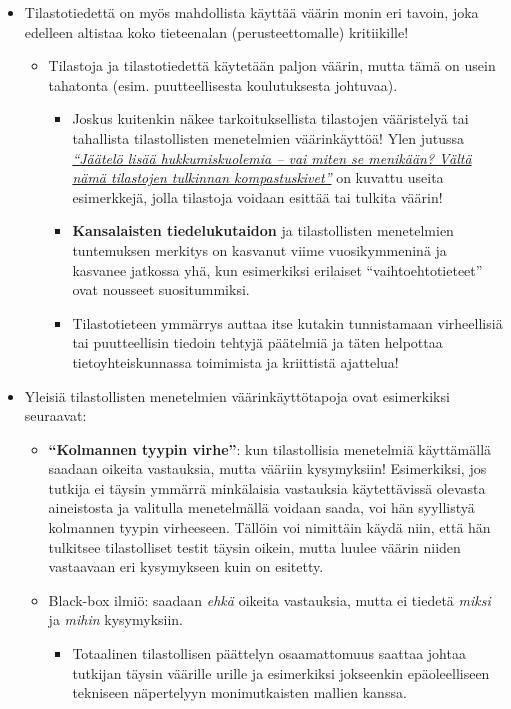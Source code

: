 \documentclass[
]{book}
\providecommand{\tightlist}{%
  \setlength{\itemsep}{0pt}\setlength{\parskip}{0pt}}
\begin{document}
\begin{itemize}
\tightlist
\item
  Tilastotiedettä on myös mahdollista käyttää väärin monin eri tavoin, joka edelleen altistaa koko tieteenalan (perusteettomalle) kritiikille!

  \begin{itemize}
  \tightlist
  \item
    Tilastoja ja tilastotiedettä käytetään paljon väärin, mutta tämä on usein tahatonta (esim. puutteellisesta koulutuksesta johtuvaa).

    \begin{itemize}
    \tightlist
    \item
      Joskus kuitenkin näkee tarkoituksellista tilastojen vääristelyä tai tahallista tilastollisten menetelmien väärinkäyttöä! Ylen jutussa \href{https://yle.fi/aihe/artikkeli/2021/03/27/jaatelo-lisaa-hukkumiskuolemia-vai-miten-se-menikaan-valta-nama-tilastojen}{\emph{``Jäätelö lisää hukkumiskuolemia -- vai miten se menikään? Vältä nämä tilastojen tulkinnan kompastuskivet''}} on kuvattu useita esimerkkejä, jolla tilastoja voidaan esittää tai tulkita väärin!
    \item
      \textbf{Kansalaisten tiedelukutaidon} ja tilastollisten menetelmien tuntemuksen merkitys on kasvanut viime vuosikymmeninä ja kasvanee jatkossa yhä, kun esimerkiksi erilaiset ``vaihtoehtotieteet'' ovat nousseet suositummiksi.
    \item
      Tilastotieteen ymmärrys auttaa itse kutakin tunnistamaan virheellisiä tai puutteellisin tiedoin tehtyjä päätelmiä ja täten helpottaa tietoyhteiskunnassa toimimista ja kriittistä ajattelua!
    \end{itemize}
  \end{itemize}
\item
  Yleisiä tilastollisten menetelmien väärinkäyttötapoja ovat esimerkiksi seuraavat:

  \begin{itemize}
  \tightlist
  \item
    \textbf{``Kolmannen tyypin virhe''}: kun tilastollisia menetelmiä käyttämällä saadaan oikeita vastauksia, mutta vääriin kysymyksiin! Esimerkiksi, jos tutkija ei täysin ymmärrä minkälaisia vastauksia käytettävissä olevasta aineistosta ja valitulla menetelmällä voidaan saada, voi hän syyllistyä kolmannen tyypin virheeseen. Tällöin voi nimittäin käydä niin, että hän tulkitsee tilastolliset testit täysin oikein, mutta luulee väärin niiden vastaavaan eri kysymykseen kuin on esitetty.
  \item
    Black-box ilmiö: saadaan \emph{ehkä} oikeita vastauksia, mutta ei tiedetä \emph{miksi} ja \emph{mihin} kysymyksiin.

    \begin{itemize}
    \tightlist
    \item
      Totaalinen tilastollisen päättelyn osaamattomuus saattaa johtaa tutkijan täysin väärille urille ja esimerkiksi jokseenkin epäoleelliseen tekniseen näpertelyyn monimutkaisten mallien kanssa.
    \end{itemize}
  \end{itemize}
\end{itemize}
\end{document}
